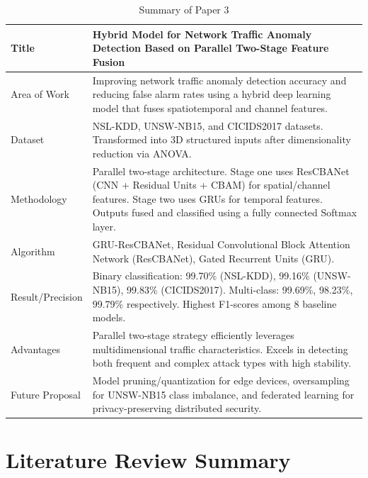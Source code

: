\documentclass[12pt,a4paper]{report}
\begin{document}
\begin{table}[H]
\centering
\renewcommand{\arraystretch}{1.3}
\begin{tabularx}{\textwidth}{|>{\centering\arraybackslash}p{3.2cm}|X|}
\hline
Title & Hybrid Model for Network Traffic Anomaly Detection Based on Parallel Two-Stage Feature Fusion \\
\hline
Area of Work & Improving network traffic anomaly detection accuracy and reducing false alarm rates using a hybrid deep learning model that fuses spatiotemporal and channel features. \\
\hline
Dataset & NSL-KDD, UNSW-NB15, and CICIDS2017 datasets. Transformed into 3D structured inputs after dimensionality reduction via ANOVA. \\
\hline
Methodology & Parallel two-stage architecture. Stage one uses ResCBANet (CNN + Residual Units + CBAM) for spatial/channel features. Stage two uses GRUs for temporal features. Outputs fused and classified using a fully connected Softmax layer. \\
\hline
Algorithm & GRU-ResCBANet, Residual Convolutional Block Attention Network (ResCBANet), Gated Recurrent Units (GRU). \\
\hline
Result/Precision & Binary classification: 99.70\% (NSL-KDD), 99.16\% (UNSW-NB15), 99.83\% (CICIDS2017). Multi-class: 99.69\%, 98.23\%, 99.79\% respectively. Highest F1-scores among 8 baseline models. \\
\hline
Advantages & Parallel two-stage strategy efficiently leverages multidimensional traffic characteristics. Excels in detecting both frequent and complex attack types with high stability. \\
\hline
Future Proposal & Model pruning/quantization for edge devices, oversampling for UNSW-NB15 class imbalance, and federated learning for privacy-preserving distributed security. \\
\hline
\end{tabularx}
\caption{Summary of Paper 3}
\label{tab:paper3}
\end{table}

\clearpage
\section{Literature Review Summary}
\end{document}
